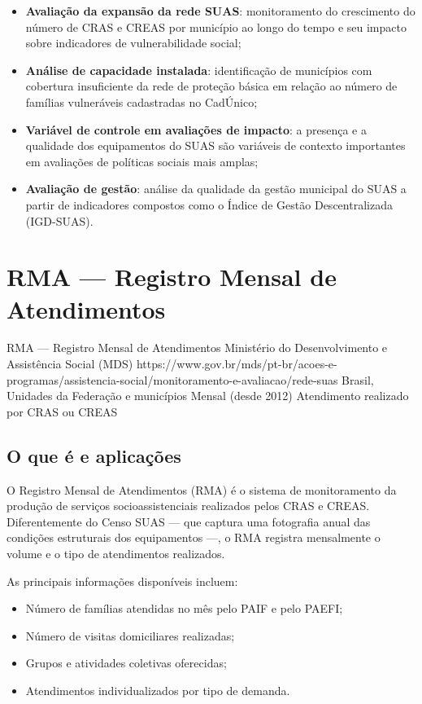 \begin{itemize}
  \item \textbf{Avaliação da expansão da rede SUAS}: monitoramento do crescimento do número de CRAS e CREAS por município ao longo do tempo e seu impacto sobre indicadores de vulnerabilidade social;
  \item \textbf{Análise de capacidade instalada}: identificação de municípios com cobertura insuficiente da rede de proteção básica em relação ao número de famílias vulneráveis cadastradas no CadÚnico;
  \item \textbf{Variável de controle em avaliações de impacto}: a presença e a qualidade dos equipamentos do SUAS são variáveis de contexto importantes em avaliações de políticas sociais mais amplas;
  \item \textbf{Avaliação de gestão}: análise da qualidade da gestão municipal do SUAS a partir de indicadores compostos como o Índice de Gestão Descentralizada (IGD-SUAS).
\end{itemize}

\section{RMA — Registro Mensal de Atendimentos}

\ficharapida
  {RMA — Registro Mensal de Atendimentos}
  {Ministério do Desenvolvimento e Assistência Social (MDS)}
  {https://www.gov.br/mds/pt-br/acoes-e-programas/assistencia-social/monitoramento-e-avaliacao/rede-suas}
  {Brasil, Unidades da Federação e municípios}
  {Mensal (desde 2012)}
  {Atendimento realizado por CRAS ou CREAS}

\subsection{O que é e aplicações}

O Registro Mensal de Atendimentos (RMA) é o sistema de monitoramento da produção de serviços socioassistenciais realizados pelos CRAS e CREAS. Diferentemente do Censo SUAS — que captura uma fotografia anual das condições estruturais dos equipamentos —, o RMA registra mensalmente o volume e o tipo de atendimentos realizados.

As principais informações disponíveis incluem:
\begin{itemize}
  \item Número de famílias atendidas no mês pelo PAIF e pelo PAEFI;
  \item Número de visitas domiciliares realizadas;
  \item Grupos e atividades coletivas oferecidas;
  \item Atendimentos individualizados por tipo de demanda.
\end{itemize}

